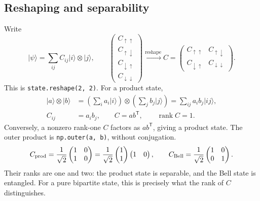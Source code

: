 \documentclass[11pt]{article}
\newcommand{\ket}[1]{\lvert #1\rangle}
\newcommand{\mtwo}[4]{\begin{pmatrix}#1&#2\\#3&#4\end{pmatrix}}
\newcommand{\vfour}[4]{\begin{pmatrix}#1\\#2\\#3\\#4\end{pmatrix}}
\begin{document}
\subsection*{Reshaping and separability}
Write
\begin{equation}
\ket{\psi}=\sum_{ij}C_{ij}\ket{i}\otimes\ket{j},\qquad
\vfour{C_{\uparrow\uparrow}}{C_{\uparrow\downarrow}}
{C_{\downarrow\uparrow}}{C_{\downarrow\downarrow}}
\xrightarrow{\text{reshape}}
C=\mtwo{C_{\uparrow\uparrow}}{C_{\uparrow\downarrow}}
{C_{\downarrow\uparrow}}{C_{\downarrow\downarrow}}.
\end{equation}
This is \texttt{state.reshape(2, 2)}. For a product state,
\begin{align}
\ket{a}\otimes\ket{b}
&=\left(\sum_i a_i\ket{i}\right)\otimes
\left(\sum_j b_j\ket{j}\right)=\sum_{ij}a_i b_j\ket{ij},\\
C_{ij}&=a_i b_j,\qquad C=ab^{\mathsf T},\qquad\operatorname{rank}C=1.
\end{align}
Conversely, a nonzero rank-one $C$ factors as $ab^{\mathsf T}$, giving a product state.
The outer product is \texttt{np.outer(a, b)}, without conjugation.
\begin{equation}
C_{\rm prod}=\frac1{\sqrt2}\mtwo{1}{0}{1}{0}
=\frac1{\sqrt2}\begin{pmatrix}1\\1\end{pmatrix}\begin{pmatrix}1&0\end{pmatrix},
\qquad C_{\rm Bell}=\frac1{\sqrt2}\mtwo{1}{0}{0}{1}.
\end{equation}
Their ranks are one and two: the product state is separable, and the Bell state is entangled. For a pure bipartite state, this is precisely what the rank of $C$ distinguishes.
\end{document}
